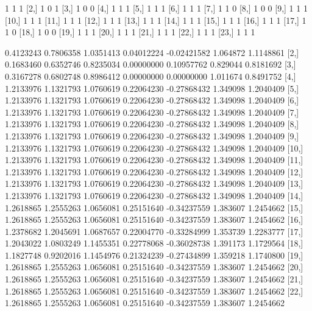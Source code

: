 \documentclass[a4paper]{article}
\begin{document}
\begin{Schunk}
\begin{Soutput}
      [,38] [,39] [,40]
 [1,]     1     1     1
 [2,]     1     0     1
 [3,]     1     0     0
 [4,]     1     1     1
 [5,]     1     1     1
 [6,]     1     1     1
 [7,]     1     1     0
 [8,]     1     0     0
 [9,]     1     1     1
[10,]     1     1     1
[11,]     1     1     1
[12,]     1     1     1
[13,]     1     1     1
[14,]     1     1     1
[15,]     1     1     1
[16,]     1     1     1
[17,]     1     1     0
[18,]     1     0     0
[19,]     1     1     1
[20,]     1     1     1
[21,]     1     1     1
[22,]     1     1     1
[23,]     1     1     1
\end{Soutput}
\begin{Soutput}
           [,1]      [,2]      [,3]       [,4]        [,5]     [,6]      [,7]
 [1,] 0.4123243 0.7806358 1.0351413 0.04012224 -0.02421582 1.064872 1.1148861
 [2,] 0.1683460 0.6352746 0.8235034 0.00000000  0.10957762 0.829044 0.8181692
 [3,] 0.3167278 0.6802748 0.8986412 0.00000000  0.00000000 1.011674 0.8491752
 [4,] 1.2133976 1.1321793 1.0760619 0.22064230 -0.27868432 1.349098 1.2040409
 [5,] 1.2133976 1.1321793 1.0760619 0.22064230 -0.27868432 1.349098 1.2040409
 [6,] 1.2133976 1.1321793 1.0760619 0.22064230 -0.27868432 1.349098 1.2040409
 [7,] 1.2133976 1.1321793 1.0760619 0.22064230 -0.27868432 1.349098 1.2040409
 [8,] 1.2133976 1.1321793 1.0760619 0.22064230 -0.27868432 1.349098 1.2040409
 [9,] 1.2133976 1.1321793 1.0760619 0.22064230 -0.27868432 1.349098 1.2040409
[10,] 1.2133976 1.1321793 1.0760619 0.22064230 -0.27868432 1.349098 1.2040409
[11,] 1.2133976 1.1321793 1.0760619 0.22064230 -0.27868432 1.349098 1.2040409
[12,] 1.2133976 1.1321793 1.0760619 0.22064230 -0.27868432 1.349098 1.2040409
[13,] 1.2133976 1.1321793 1.0760619 0.22064230 -0.27868432 1.349098 1.2040409
[14,] 1.2618865 1.2555263 1.0656081 0.25151640 -0.34237559 1.383607 1.2454662
[15,] 1.2618865 1.2555263 1.0656081 0.25151640 -0.34237559 1.383607 1.2454662
[16,] 1.2378682 1.2045691 1.0687657 0.22004770 -0.33284999 1.353739 1.2283777
[17,] 1.2043022 1.0803249 1.1455351 0.22778068 -0.36028738 1.391173 1.1729564
[18,] 1.1827748 0.9202016 1.1454976 0.21324239 -0.27434899 1.359218 1.1740800
[19,] 1.2618865 1.2555263 1.0656081 0.25151640 -0.34237559 1.383607 1.2454662
[20,] 1.2618865 1.2555263 1.0656081 0.25151640 -0.34237559 1.383607 1.2454662
[21,] 1.2618865 1.2555263 1.0656081 0.25151640 -0.34237559 1.383607 1.2454662
[22,] 1.2618865 1.2555263 1.0656081 0.25151640 -0.34237559 1.383607 1.2454662

\end{Soutput}
\end{Schunk}
\end{document}
